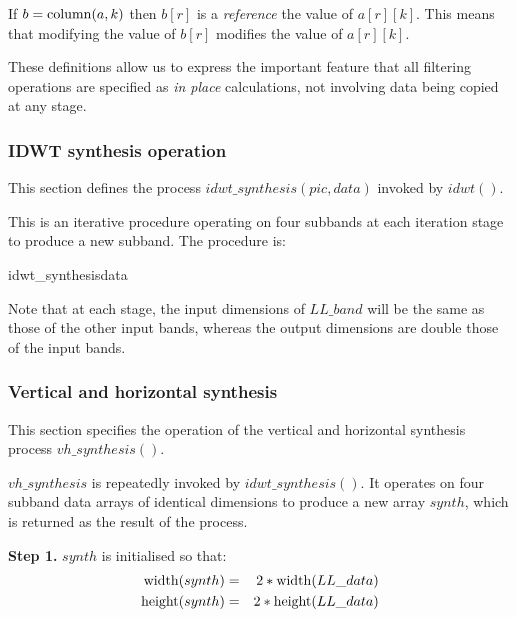 If $b=\operatorname{column}(a,k)$ then $b[r]$ is a {\em reference} the value of $a[r][k]$. This means that modifying the
value of $b[r]$ modifies the value of $a[r][k]$.

\begin{informative}
These definitions allow us to express the important feature that all filtering operations are specified
as {\em in place} calculations, not involving data being copied at any stage.
\end{informative}

\subsubsection{IDWT synthesis operation}
\label{idwtsynthesis}
This section defines the process $idwt\_synthesis(pic, data)$ invoked by $idwt()$.

This is an iterative procedure operating on four subbands at each
iteration stage to produce a new subband. The procedure
is:

\begin{pseudo}{idwt\_synthesis}{data}
\bsEND
{}
\end{pseudo}

Note that at each stage, the input dimensions of $LL\_band$ will be the same as those of the
other input bands, whereas the output dimensions are double those of the input bands.

\subsubsection{Vertical and horizontal synthesis}
\label{vhsynth}

This section specifies the operation of the vertical and horizontal
synthesis process $vh\_synthesis()$.

$vh\_synthesis$ is repeatedly invoked by $idwt\_synthesis()$. It operates on four subband
data arrays of identical dimensions to produce a new array $synth$, which is returned as the result of
the process.

{\bf Step 1.} $synth$ is initialised so that:
\begin{eqnarray*}
\operatorname{width}(synth) & = & 2*\operatorname{width}(LL\_data) \\
\operatorname{height}(synth) & = & 2*\operatorname{height}(LL\_data)
\end{eqnarray*}

